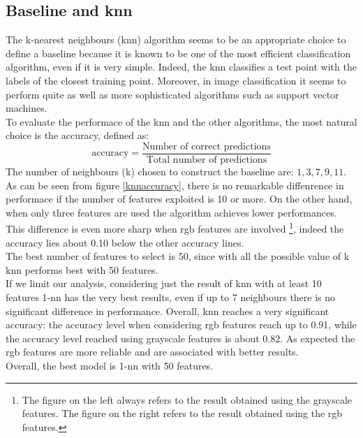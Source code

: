 \documentclass{article}
\begin{document}
\subsection{Baseline and knn}
The k-nearest neighbours (knn) algorithm seems to be an appropriate choice to define a baseline because it is known to be one of the most efficient classification algorithm, even if it is very simple. Indeed, the knn classifies a test point with the labels of the closest training point. Moreover, in image classification it seems to perform quite as well as more sophisticated algorithms such as support vector machines. \cite{knnresults} \\
To evaluate the performace of the knn and the other algorithms, the most natural choice is the accuracy, defined as:
\begin{equation}
\text{accuracy}  = \frac{\text{Number of correct predictions}}{ \text{Total number of predictions}}
\end{equation}
\noindent The number of neighbours (k) chosen to construct the baseline are: $1,3,7,9,11$.
As can be seen from figure \ref{knnaccuracy}, there is no remarkable diffenrence in performace if the number of features exploited is 10 or more. On the other hand, when only three features are used the algorithm achieves lower performances. This difference is even more sharp when rgb features are involved \footnote{The figure on the left always refers to the result obtained using the grayscale features. The figure on the right refers to the result obtained using the rgb features.}, indeed the accuracy lies about 0.10 below the other accuracy lines.\\
The best number of features to select is 50, since with all the possible value of k knn performs best with 50 features.\\
If we limit our analysis, considering just the result of knn with at least 10 features 1-nn has the very best results, even if up to 7 neighbours there is no significant difference in performance.
Overall, knn reaches a very significant accuracy: the accuracy level  when considering rgb features reach up to 0.91, while the accuracy level reached using grayscale features is about 0.82. As expected the rgb features are more reliable and are associated with better results.\\
Overall, the best model is 1-nn with 50 features.
\end{document}
